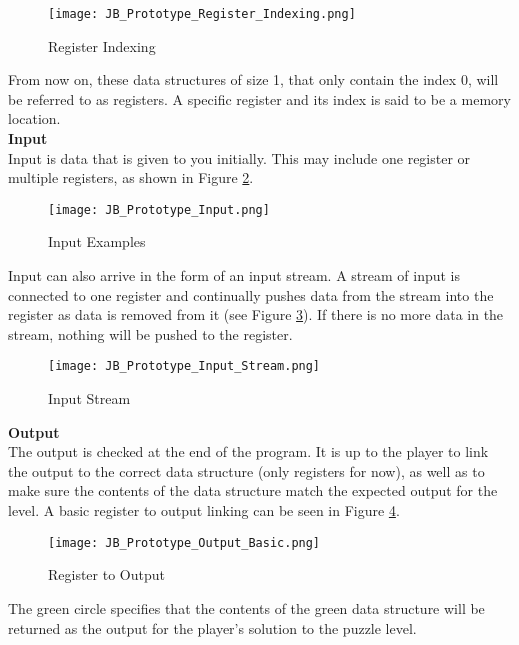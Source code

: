 \begin{figure}[!hb]
  \caption{Register Indexing}
  \label{fig:Register_Indexing}
  \centering
  \texttt{[image: JB\_Prototype\_Register\_Indexing.png]}
\end{figure}

From now on, these data structures of size 1, that only contain the index 0, will
be referred to as registers. A specific register and its index is said to be a
memory location.\\

\textbf{Input}\\

Input is data that is given to you initially. This may include one register or
multiple registers, as shown in Figure \ref{fig:Input_Example}.\\

\begin{figure}[!hb]
  \caption{Input Examples}
  \label{fig:Input_Example}
  \centering
  \texttt{[image: JB\_Prototype\_Input.png]}
\end{figure}

Input can also arrive in the form of an input stream. A stream of input is connected
to one register and continually pushes data from the stream into the register as
data is removed from it (see Figure \ref{fig:Input_Stream}). If there is no more data in the stream,
nothing will be pushed to the register.

\begin{figure}[!hb]
  \caption{Input Stream}
  \label{fig:Input_Stream}
  \centering
  \texttt{[image: JB\_Prototype\_Input\_Stream.png]}
\end{figure}
\vfill
\clearpage

\textbf{Output}\\

The output is checked at the end of the program. It is up to the player to link
the output to the correct data structure (only registers for now), as well as to
make sure the contents of the data structure match the expected output for the level.
A basic register to output linking can be seen in Figure \ref{fig:Output_Basic}.

\begin{figure}[!hb]
  \caption{Register to Output}
  \label{fig:Output_Basic}
  \centering
  \texttt{[image: JB\_Prototype\_Output\_Basic.png]}
\end{figure}

The green circle specifies that the contents of the green data structure will be
returned as the output for the player's solution to the puzzle level.\\

